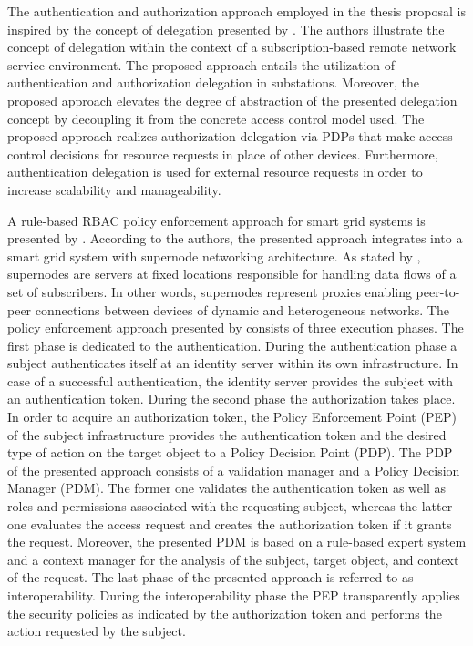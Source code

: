 The authentication and authorization approach employed in the thesis proposal is inspired by the concept of delegation presented by \citeauthor{Ma2006}.
The authors illustrate the concept of delegation within the context of a subscription-based remote network service environment.
The proposed approach entails the utilization of authentication and authorization delegation in substations.
Moreover, the proposed approach elevates the degree of abstraction of the presented delegation concept by decoupling it from the concrete access control model used.
The proposed approach realizes authorization delegation via PDPs that make access control decisions for resource requests in place of other devices.
Furthermore, authentication delegation is used for external resource requests in order to increase scalability and manageability.

A rule-based RBAC policy enforcement approach for smart grid systems is presented by \citeauthor{Alcaraz2016} \cite{Alcaraz2016}.
According to the authors, the presented approach integrates into a smart grid system with supernode networking architecture.
As stated by \citeauthor{Samuel2008} \cite{Samuel2008}, supernodes are servers at fixed locations responsible for handling data flows of a set of subscribers.
In other words, supernodes represent proxies enabling peer-to-peer connections between devices of dynamic and heterogeneous networks.
The policy enforcement approach presented by \citeauthor{Alcaraz2016} consists of three execution phases.
The first phase is dedicated to the authentication.
During the authentication phase a subject authenticates itself at an identity server within its own infrastructure.
In case of a successful authentication, the identity server provides the subject with an authentication token.
During the second phase the authorization takes place.
In order to acquire an authorization token, the Policy Enforcement Point (PEP) of the subject infrastructure provides the authentication token and the desired type of action on the target object to a Policy Decision Point (PDP).
The PDP of the presented approach consists of a validation manager and a Policy Decision Manager (PDM).
The former one validates the authentication token as well as roles and permissions associated with the requesting subject, whereas the latter one evaluates the access request and creates the authorization token if it grants the request.
Moreover, the presented PDM is based on a rule-based expert system and a context manager for the analysis of the subject, target object, and context of the request.   
The last phase of the presented approach is referred to as interoperability.
During the interoperability phase the PEP transparently applies the security policies as indicated by the authorization token and performs the action requested by the subject.

